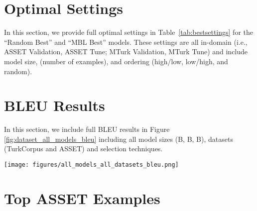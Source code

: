 \documentclass[11pt]{article}
\begin{document}



\clearpage
\appendix

\section{Optimal Settings}
\label{sec:optimalsettings}

In this section, we provide full optimal settings in Table~\ref{tab:bestsettings} for the ``Random Best'' and ``MBL Best'' models. These settings are all in-domain (i.e., ASSET Validation, ASSET Tune; MTurk Validation, MTurk Tune) and include model size,  (number of examples), and ordering (high/low, low/high, and random).



\begin{table}[!htp]
\caption{MBL-Best and Random-Best settings for results}
\label{tab:bestsettings}
\end{table}

\section{BLEU Results}
\label{sec:bleuresults}

In this section, we include full BLEU results in Figure \ref{fig:dataset_all_models_bleu} including all model sizes (B, B, B), datasets (TurkCorpus and ASSET) and selection techniques. 

\begin{figure*}[ht]
    \centering  
    \texttt{[image: figures/all\_models\_all\_datasets\_bleu.png]}
    \caption{BLEU scores for GPT-6.5, GPT-13B and GPT-175B models on ASSET (top) and TurkCorpus (bottom) datasets.}
    \label{fig:dataset_all_models_bleu}
\end{figure*}


\section{Top ASSET Examples}
\label{sec:topasset}
\end{document}
